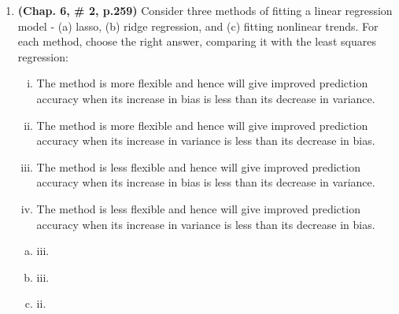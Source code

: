 \documentclass[12pt]{article}\usepackage[]{graphicx}\usepackage[]{color}
\theoremstyle{definition}
\begin{document}
\begin{enumerate}[1.]
  \item \textbf{(Chap. 6, \# 2, p.259)} Consider three methods of fitting a linear regression model - (a) lasso, (b) ridge regression, and (c) fitting nonlinear trends. For each method, choose the right answer, comparing it with the least squares regression:
    \begin{enumerate}[i.]
      \item The method is more flexible and hence will give improved prediction accuracy when its increase in bias is less than its decrease in variance.
      \item The method is more flexible and hence will give improved prediction accuracy when its increase in variance is less than its decrease in bias.
      \item The method is less flexible and hence will give improved prediction accuracy when its increase in bias is less than its decrease in variance.
      \item The method is less flexible and hence will give improved prediction accuracy when its increase in variance is less than its decrease in bias.
    \end{enumerate}
    \begin{enumerate}[(a)]
      \item iii.
      \item iii.
      \item ii.
    \end{enumerate}


\end{enumerate}
\end{document}
